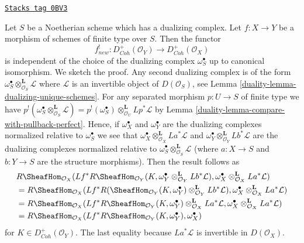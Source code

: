 \begin{remark}
\label{duality-remark-independent-omega-S}
\href{https://stacks.math.columbia.edu/tag/0BV3}{\texttt{Stacks tag 0BV3}}

Let $S$ be a Noetherian scheme which has a dualizing complex.
Let $f : X \to Y$ be a morphism of schemes of finite type
over $S$. Then the functor
$$
f_{new}^! : D^+_{Coh}(\mathcal{O}_Y) \to D^+_{Coh}(\mathcal{O}_X)
$$
is independent of the choice of the dualizing complex $\omega_S^\bullet$
up to canonical isomorphism. We sketch the proof. Any second dualizing complex
is of the form $\omega_S^\bullet \otimes_{\mathcal{O}_S}^\mathbf{L} \mathcal{L}$
where $\mathcal{L}$ is an invertible object of $D(\mathcal{O}_S)$, see
Lemma \ref{duality-lemma-dualizing-unique-schemes}.
For any separated morphism $p : U \to S$ of finite type we have
$p^!(\omega_S^\bullet \otimes^\mathbf{L}_{\mathcal{O}_S} \mathcal{L}) =
p^!(\omega_S^\bullet) \otimes^\mathbf{L}_{\mathcal{O}_U} Lp^*\mathcal{L}$
by Lemma \ref{duality-lemma-compare-with-pullback-perfect}.
Hence, if $\omega_X^\bullet$ and $\omega_Y^\bullet$ are the
dualizing complexes normalized relative to $\omega_S^\bullet$ we see that
$\omega_X^\bullet \otimes_{\mathcal{O}_X}^\mathbf{L} La^*\mathcal{L}$ and
$\omega_Y^\bullet \otimes_{\mathcal{O}_Y}^\mathbf{L} Lb^*\mathcal{L}$
are the dualizing complexes normalized relative to
$\omega_S^\bullet \otimes_{\mathcal{O}_S}^\mathbf{L} \mathcal{L}$
(where $a : X \to S$ and $b : Y \to S$ are the structure morphisms).
Then the result follows as
\begin{align*}
& R\SheafHom_{\mathcal{O}_X}(Lf^*R\SheafHom_{\mathcal{O}_Y}(K,
\omega_Y^\bullet \otimes_{\mathcal{O}_Y}^\mathbf{L} Lb^*\mathcal{L}),
\omega_X^\bullet \otimes_{\mathcal{O}_X}^\mathbf{L} La^*\mathcal{L}) \\
& = R\SheafHom_{\mathcal{O}_X}(Lf^*R(\SheafHom_{\mathcal{O}_Y}(K,
\omega_Y^\bullet) \otimes_{\mathcal{O}_Y}^\mathbf{L} Lb^*\mathcal{L}),
\omega_X^\bullet \otimes_{\mathcal{O}_X}^\mathbf{L} La^*\mathcal{L}) \\
& = R\SheafHom_{\mathcal{O}_X}(Lf^*R\SheafHom_{\mathcal{O}_Y}(K,
\omega_Y^\bullet) \otimes_{\mathcal{O}_X}^\mathbf{L} La^*\mathcal{L},
\omega_X^\bullet \otimes_{\mathcal{O}_X}^\mathbf{L} La^*\mathcal{L}) \\
& = R\SheafHom_{\mathcal{O}_X}(Lf^*R\SheafHom_{\mathcal{O}_Y}(K,
\omega_Y^\bullet), \omega_X^\bullet)
\end{align*}
for $K \in D^+_{Coh}(\mathcal{O}_Y)$.
The last equality because $La^*\mathcal{L}$ is invertible in
$D(\mathcal{O}_X)$.
\end{remark}


